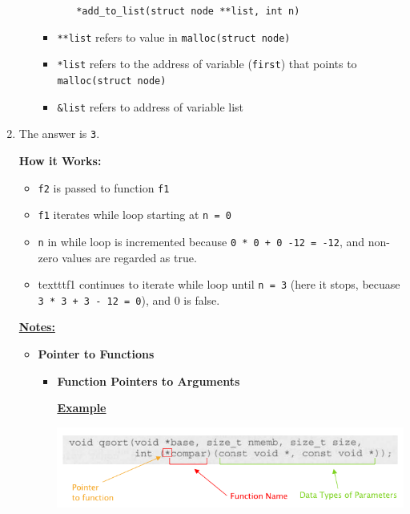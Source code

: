 \documentclass[12pt]{article}
\begin{document}
\begin{enumerate}[1.]
\begin{itemize}
\begin{itemize}
\begin{itemize}
                \bigskip

                \texttt{*add\_to\_list(struct node **list, int n)}
            \end{itemize}

            \item \texttt{**list} refers to value in \texttt{malloc(struct node)}
            \item \texttt{*list} refers to the address of variable (\texttt{first}) that points to \texttt{malloc(struct node)}
            \item \texttt{\&list} refers to address of variable list
        \end{itemize}
    \end{itemize}

    \item

    \bigskip

    The answer is \texttt{3}.

    \bigskip

    \textbf{How it Works:}

    \begin{itemize}
        \item \texttt{f2} is passed to function \texttt{f1}
        \item \texttt{f1} iterates while loop starting at \texttt{n = 0}
        \item \texttt{n} in while loop is incremented because \texttt{0 * 0 + 0 -12 = -12},
        and non-zero values are regarded as true.
        \item texttt{f1} continues to iterate while loop until \texttt{n = 3}
        (here it stops, becuase \texttt{3 * 3 + 3 - 12 = 0}), and 0 is false.
    \end{itemize}

    \underline{\textbf{Notes:}}

    \begin{itemize}
        \item \textbf{Pointer to Functions}

        \begin{itemize}
            \item \textbf{Function Pointers to Arguments}

            \bigskip

            \underline{\textbf{Example}}

            \bigskip

            \begin{center}
            \includegraphics[width=\linewidth]{images/review_8_solution_9.png}
            \end{center}


\end{itemize}
\end{itemize}
\end{enumerate}
\end{document}

